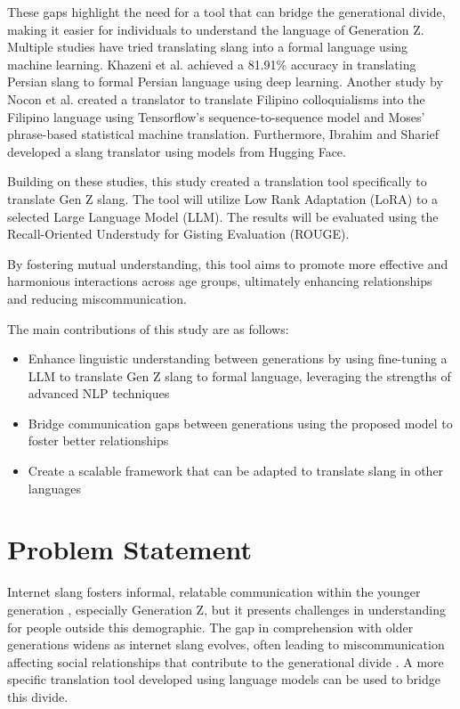 These gaps highlight the need for a tool that can bridge the generational divide, making it easier for individuals to understand the language of Generation Z. Multiple studies have tried translating slang into a formal language using machine learning. Khazeni et al. achieved a 81.91\% accuracy in translating Persian slang to formal Persian language using deep learning. Another study by Nocon et al. created a translator to translate Filipino colloquialisms into the Filipino language using Tensorflow’s sequence-to-sequence model and Moses’ phrase-based statistical machine translation. Furthermore, Ibrahim and Sharief developed a slang translator using models from Hugging Face. 

Building on these studies, this study created a translation tool specifically to translate Gen Z slang. The tool will utilize Low Rank Adaptation (LoRA) to a selected Large Language Model (LLM). The results will be evaluated using the Recall-Oriented Understudy for Gisting Evaluation (ROUGE). 

By fostering mutual understanding, this tool aims to promote more effective and harmonious interactions across age groups, ultimately enhancing relationships and reducing miscommunication.

The main contributions of this study are as follows:
\begin{itemize}
	\item Enhance linguistic understanding between generations by using fine-tuning a LLM to translate Gen Z slang to formal language, leveraging the strengths of advanced NLP techniques
	\item Bridge communication gaps between generations using the proposed model to foster better relationships
	\item Create a scalable framework that can be adapted to translate slang in other languages
\end{itemize}

\section{Problem Statement}
\label{sec:problem_statement}

Internet slang fosters informal, relatable communication within the younger generation \cite{Ghazali_Abdullah_2021}, especially Generation Z, but it presents challenges in understanding for people outside this demographic. 
The gap in comprehension with older generations widens as internet slang evolves, often leading to miscommunication affecting social relationships that contribute to the generational divide \cite{Vacalares_Salas_Babac_Cagalawan_Calimpong_2023}. 
A more specific translation tool developed using language models can be used to bridge this divide.

